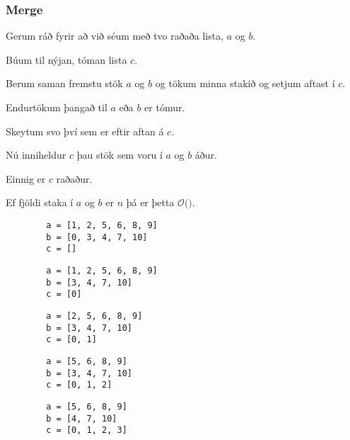 {
	\frametitle{Merge}
	{
		\item<1-> Gerum ráð fyrir að við séum með tvo raðaða lista, $a$ og $b$.
		\item<2-> Búum til nýjan, tóman lista $c$.
		\item<3-> Berum saman fremstu stök $a$ og $b$ og tökum minna stakið og setjum aftast í $c$.
		\item<4-> Endurtökum þangað til $a$ eða $b$ er tómur.
		\item<5-> Skeytum svo því sem er eftir aftan á $c$.
		\item<6-> Nú inniheldur $c$ þau stök sem voru í $a$ og $b$ áður.
		\item<7-> Einnig er $c$ raðaður.
		\item<8-> Ef fjöldi staka í $a$ og $b$ er $n$ þá er þetta $\mathcal{O}($\onslide<9->{$\,n\,$}$)$.
	}
}

\begin{frame}[fragile]
\begin{verbatim}
        a = [1, 2, 5, 6, 8, 9]
        b = [0, 3, 4, 7, 10]
        c = []
\end{verbatim}
\end{frame}
\addtocounter{framenumber}{-1}

\begin{frame}[fragile]
\begin{verbatim}
        a = [1, 2, 5, 6, 8, 9]
        b = [3, 4, 7, 10]
        c = [0]
\end{verbatim}
\end{frame}
\addtocounter{framenumber}{-1}

\begin{frame}[fragile]
\begin{verbatim}
        a = [2, 5, 6, 8, 9]
        b = [3, 4, 7, 10]
        c = [0, 1]
\end{verbatim}
\end{frame}
\addtocounter{framenumber}{-1}

\begin{frame}[fragile]
\begin{verbatim}
        a = [5, 6, 8, 9]
        b = [3, 4, 7, 10]
        c = [0, 1, 2]
\end{verbatim}
\end{frame}
\addtocounter{framenumber}{-1}

\begin{frame}[fragile]
\begin{verbatim}
        a = [5, 6, 8, 9]
        b = [4, 7, 10]
        c = [0, 1, 2, 3]
\end{verbatim}
\end{frame}
\addtocounter{framenumber}{-1}

